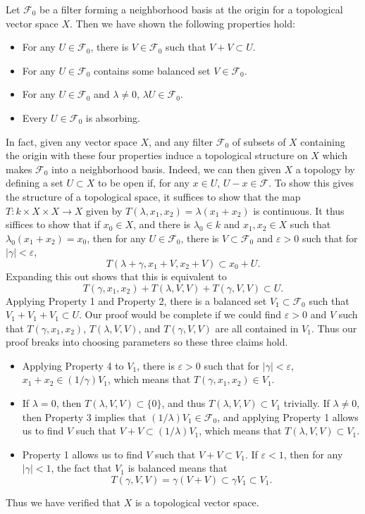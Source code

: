Let $\mathcal{F}_0$ be a filter forming a neighborhood basis at the origin for a topological vector space $X$. Then we have shown the following properties hold:
%
\begin{itemize}
    \item For any $U \in \mathcal{F}_0$, there is $V \in \mathcal{F}_0$ such that $V + V \subset U$.
    \item For any $U \in \mathcal{F}_0$ contains some balanced set $V \in \mathcal{F}_0$.
    \item For any $U \in \mathcal{F}_0$ and $\lambda \neq 0$, $\lambda U \in \mathcal{F}_0$.
    \item Every $U \in \mathcal{F}_0$ is absorbing.
\end{itemize}
%
In fact, given any vector space $X$, and any filter $\mathcal{F}_0$ of subsets of $X$ containing the origin with these four properties induce a topological structure on $X$ which makes $\mathcal{F}_0$ into a neighborhood basis. Indeed, we can then given $X$ a topology by defining a set $U \subset X$ to be open if, for any $x \in U$, $U - x \in \mathcal{F}$. To show this gives the structure of a topological space, it suffices to show that the map $T: k \times X \times X \to X$ given by $T(\lambda,x_1,x_2) = \lambda(x_1 + x_2)$ is continuous. It thus siffices to show that if $x_0 \in X$, and there is $\lambda_0 \in k$ and $x_1,x_2 \in X$ such that $\lambda_0(x_1 + x_2) = x_0$, then for any $U \in \mathcal{F}_0$, there is $V \subset \mathcal{F}_0$ and $\varepsilon > 0$ such that for $|\gamma| < \varepsilon$,
%
\[ T(\lambda + \gamma, x_1 + V, x_2 + V) \subset x_0 + U. \]
%
Expanding this out shows that this is equivalent to
%
\[ T(\gamma,x_1,x_2) + T(\lambda,V,V) + T(\gamma,V,V) \subset U. \]
%
Applying Property 1 and Property 2, there is a balanced set $V_1 \subset \mathcal{F}_0$ such that $V_1 + V_1 + V_1 \subset U$. Our proof would be complete if we could find $\varepsilon > 0$ and $V$ such that $T(\gamma,x_1,x_2)$, $T(\lambda,V,V)$, and $T(\gamma,V,V)$ are all contained in $V_1$. Thus our proof breaks into choosing parameters so these three claims hold.
%
\begin{itemize}
    \item Applying Property 4 to $V_1$, there is $\varepsilon > 0$ such that for $|\gamma| < \varepsilon$, $x_1 + x_2 \in (1/\gamma) V_1$, which means that $T(\gamma,x_1,x_2) \in V_1$.

    \item If $\lambda = 0$, then $T(\lambda,V,V) \subset \{ 0 \}$, and thus $T(\lambda,V,V) \subset V_1$ trivially. If $\lambda \neq 0$, then Property 3 implies that $(1/\lambda) V_1 \in \mathcal{F}_0$, and applying Property 1 allows us to find $V$ such that $V + V \subset (1/\lambda) V_1$, which means that $T(\lambda,V,V) \subset V_1$.

    \item Property 1 allows us to find $V$ such that $V + V \subset V_1$. If $\varepsilon < 1$, then for any $|\gamma| < 1$, the fact that $V_1$ is balanced means that
    \[ T(\gamma,V,V) = \gamma(V + V) \subset \gamma V_1 \subset V_1. \]
\end{itemize}
%
Thus we have verified that $X$ is a topological vector space.

